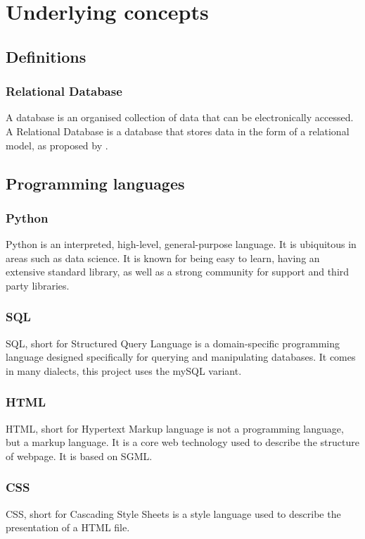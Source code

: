
\section{Underlying concepts}
    \subsection{Definitions}
        \subsubsection{Relational Database}
        A database is an organised collection of data that can be electronically accessed. A Relational Database is a database that stores data in the form of a relational model, as proposed by \cite{Codd}.
    \subsection{Programming languages}
        \subsubsection{Python}
        Python is an interpreted, high-level, general-purpose language. It is ubiquitous in areas such as data science. It is known for being easy to learn, having an extensive standard library, as well as a strong community for support and third party libraries.
        \subsubsection{SQL}
        SQL, short for Structured Query Language is a domain-specific programming language designed specifically for querying and manipulating databases. It comes in many dialects, this project uses the mySQL variant.
        \subsubsection{HTML} 
        HTML, short for Hypertext Markup language is not a programming language, but a markup language. It is a core web technology used to describe the structure of webpage. It is based on SGML.
        \subsubsection{CSS}
        CSS, short for Cascading Style Sheets is a style language used to describe the presentation of a HTML file.

